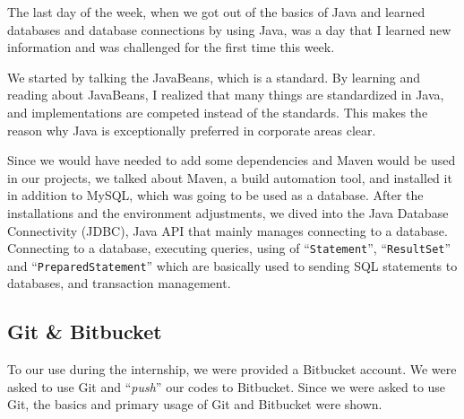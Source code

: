 The last day of the week, when we got out of the basics of Java and learned databases and database connections by using Java, was a day that I learned new information and was challenged for the first time this week.

We started by talking the JavaBeans, which is a standard. By learning and reading about JavaBeans, I realized that many things are standardized in Java, and implementations are competed instead of the standards. This makes the reason why Java is exceptionally preferred in corporate areas clear.

Since we would have needed to add some dependencies and Maven would be used in our projects, we talked about Maven, a build automation tool, and installed it in addition to MySQL, which was going to be used as a database. After the installations and the environment adjustments, we dived into the Java Database Connectivity (JDBC), Java API that mainly manages connecting to a database. Connecting to a database, executing queries, using of ``\texttt{Statement}'', ``\texttt{ResultSet}'' and ``\texttt{PreparedStatement}'' which are basically used to sending SQL statements to databases, and transaction management.


\subsection{Git \& Bitbucket}

To our use during the internship, we were provided a Bitbucket account. We were asked to use Git and ``\textit{push}'' our codes to Bitbucket. Since we were asked to use Git, the basics and primary usage of Git and Bitbucket were shown. 








